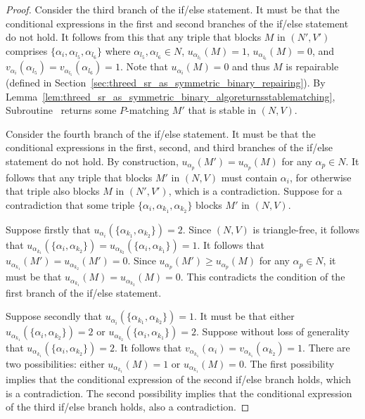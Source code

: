 \begin{proof}
Consider the third branch of the if/else statement. It must be that the conditional expressions in the first and second branches of the if/else statement do not hold. It follows from this that any triple that blocks $M$ in $(N', V')$ comprises $\{ \alpha_i, \alpha_{l_5}, \alpha_{l_6} \}$ where $\alpha_{l_5}, \alpha_{l_6}\in N$, $u_{\alpha_{l_5}}(M)=1$, $u_{\alpha_{l_6}}(M)=0$, and $v_{\alpha_i}(\alpha_{l_5})=v_{\alpha_{l_5}}(\alpha_{l_6})=1$. Note that $u_{\alpha_i}(M)=0$ and thus $M$ is repairable (defined in Section~\ref{sec:threed_sr_as_symmetric_binary_repairing}). By Lemma~\ref{lem:threed_sr_as_symmetric_binary_algoreturnsstablematching}, Subroutine~  returns some $P$\nobreakdash-matching $M'$ that is stable in $(N, V)$.

Consider the fourth branch of the if/else statement. It must be that the conditional expressions in the first, second, and third branches of the if/else statement do not hold. By construction, $u_{\alpha_p}(M') = u_{\alpha_p}(M)$ for any $\alpha_p\in N$. It follows that any triple that blocks $M'$ in $(N, V)$ must contain $\alpha_i$, for otherwise that triple also blocks $M$ in $(N', V')$, which is a contradiction. Suppose for a contradiction that some triple $\{ \alpha_i, \alpha_{k_1}, \alpha_{k_2} \}$ blocks $M'$ in $(N, V)$.

Suppose firstly that $u_{\alpha_i}(\{ \alpha_{k_1}, \alpha_{k_2} \})=2$. Since $(N, V)$ is triangle-free, it follows that $u_{\alpha_{k_1}}(\{ \alpha_{i}, \alpha_{k_2} \})=u_{\alpha_{k_2}}(\{ \alpha_{i}, \alpha_{k_1} \})=1$. It follows that $u_{\alpha_{k_1}}(M')=u_{\alpha_{k_2}}(M')=0$. Since $u_{\alpha_p}(M')\geq u_{\alpha_p}(M)$ for any $\alpha_p\in N$, it must be that $u_{\alpha_{k_1}}(M)=u_{\alpha_{k_2}}(M)=0$. This contradicts the condition of the first branch of the if/else statement.

Suppose secondly that $u_{\alpha_i}(\{ \alpha_{k_1}, \alpha_{k_2} \})=1$. It must be that either $u_{\alpha_{k_1}}(\{ \alpha_{i}, \alpha_{k_2} \})=2$ or $u_{\alpha_{k_2}}(\{ \alpha_{i}, \alpha_{k_1} \})=2$. Suppose without loss of generality that $u_{\alpha_{k_1}}(\{ \alpha_{i}, \alpha_{k_2} \})=2$. It follows that $v_{\alpha_{k_1}}(\alpha_{i})=v_{\alpha_{k_1}}(\alpha_{k_2})=1$. There are two possibilities: either $u_{\alpha_{k_1}}(M)=1$ or $u_{\alpha_{k_1}}(M)=0$. The first possibility implies that the conditional expression of the second if/else branch holds, which is a contradiction. The second possibility implies that the conditional expression of the third if/else branch holds, also a contradiction.
\end{proof}

